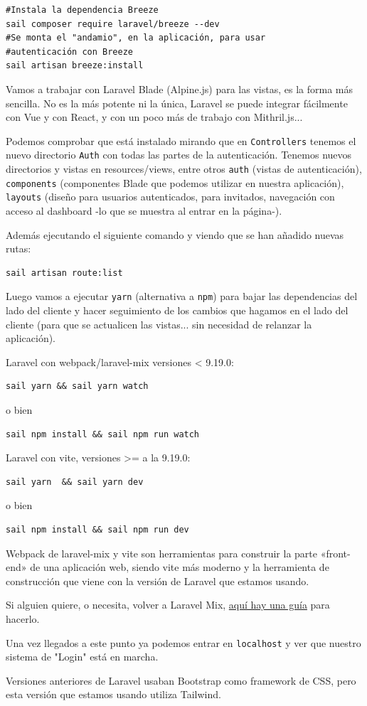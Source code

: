 \documentclass[11pt]{article}
\begin{document}
\begin{itemize}
\begin{verbatim}
#Instala la dependencia Breeze
sail composer require laravel/breeze --dev
#Se monta el "andamio", en la aplicación, para usar
#autenticación con Breeze
sail artisan breeze:install
\end{verbatim}

Vamos a trabajar con Laravel Blade (Alpine.js) para las vistas, es la
forma más sencilla. No es la más potente ni la única, Laravel se puede
integrar fácilmente con Vue y con React, y con un poco más de trabajo
con Mithril.js...


Podemos comprobar que está instalado mirando que en \texttt{Controllers}
tenemos el nuevo directorio \texttt{Auth} con todas las partes de la
autenticación. Tenemos nuevos directorios y vistas en resources/views,
entre otros \texttt{auth} (vistas de autenticación), \texttt{components}
(componentes Blade que podemos utilizar en nuestra aplicación),
\texttt{layouts} (diseño para usuarios autenticados, para invitados,
navegación con acceso al dashboard -lo que se muestra al entrar en la
página-).

Además ejecutando el siguiente comando y viendo que se han añadido
nuevas rutas:
\begin{verbatim}
sail artisan route:list
\end{verbatim}

Luego vamos a ejecutar \texttt{yarn} (alternativa a \texttt{npm}) para bajar las
dependencias del lado del cliente y hacer seguimiento de los cambios
que hagamos en el lado del cliente (para que se actualicen las
vistas... sin necesidad de relanzar la aplicación).

Laravel con webpack/laravel-mix versiones < 9.19.0:
\begin{verbatim}
sail yarn && sail yarn watch
\end{verbatim}
o bien
\begin{verbatim}
sail npm install && sail npm run watch
\end{verbatim}

Laravel con vite, versiones >= a la 9.19.0:
\begin{verbatim}
sail yarn  && sail yarn dev
\end{verbatim}
o bien
\begin{verbatim}
sail npm install && sail npm run dev
\end{verbatim}

Webpack de laravel-mix y vite son herramientas para construir la parte
«front-end» de una aplicación web, siendo vite más moderno y la
herramienta de construcción que viene con la versión de Laravel que
estamos usando.

Si alguien quiere, o necesita, volver a Laravel Mix, \href{https://github.com/laravel/vite-plugin/blob/main/UPGRADE.md\#migrating-from-vite-to-laravel-mix}{aquí hay una guía}
para hacerlo.

Una vez llegados a este punto ya podemos entrar en \texttt{localhost} y ver
que nuestro sistema de "Login" está en marcha.

Versiones anteriores de Laravel usaban Bootstrap como framework de
CSS, pero esta versión que estamos usando utiliza Tailwind.
\end{itemize}
\end{document}
